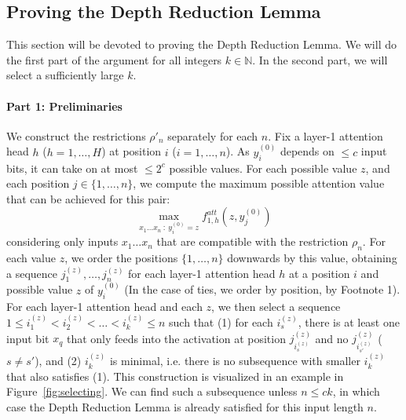 \documentclass[11pt,a4paper]{article}
\begin{document}




\subsection{Proving the Depth Reduction Lemma}
This section will be devoted to proving the Depth Reduction Lemma.
We will do the first part of the argument for all integers $k \in \mathbb{N}$.
In the second part, we will select a sufficiently large $k$. %

\paragraph{Part 1: Preliminaries}
We construct the restrictions $\rho'_n$ separately for each $n$.
Fix a layer-1 attention head $h$ ($h=1,\dots, H$) at position $i$ ($i=1, \dots, n$).
As $y^{(0)}_i$ depends on $\leq c$ input bits, it can take on at most $\leq 2^c$ possible values.
For each possible value $z$,  and each position $j \in \{1, \dots, n\}$, we compute the maximum possible attention value that can be achieved for this pair:
\begin{equation}
\max_{x_1\dots x_n\ :\ y^{(0)}_i=z} f^{att}_{1,h}(z, y^{(0)}_j)
\end{equation}
considering only inputs $x_1\dots x_n$ that are compatible with the restriction $\rho_n$.
For each value $z$, we order the positions $\{1, \dots, n\}$ downwards by this value, obtaining a sequence $j_1^{(z)}, \dots, j_n^{(z)}$ for each layer-1 attention head $h$ at a position $i$ and possible value $z$ of $y^{(0)}_i$ (In the case of ties, we order by  position, by Footnote 1).
For each layer-1 attention head and each $z$, we then select a sequence $1 \leq i_1^{(z)} < i_2^{(z)} < \dots < i_{k}^{(z)} \leq n$ such that (1) for each $i_s^{(z)}$, there is at least one input bit $x_q$ that only feeds into the activation at position $j_{i_s^{(z)}}^{(z)}$ and no $j_{i_{s'}^{(z)}}^{(z)}$ ($s\neq s'$), and (2) $i_{k}^{(z)}$ is minimal, i.e. there is no subsequence with smaller $i_{k}^{(z)}$ that also satisfies (1).
This construction is visualized in an example in Figure~\ref{fig:selecting}.
We can find such a subsequence unless $n \leq ck$, in which case the Depth Reduction Lemma is already satisfied for this input length $n$.
\end{document}
